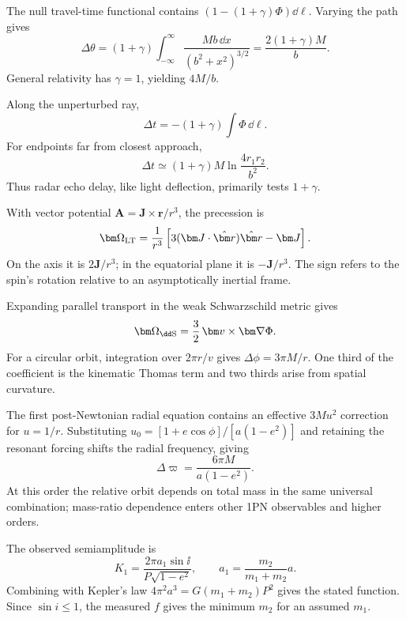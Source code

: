\begin{solution}
The null travel-time functional contains
\((1-(1+\gamma)\Phi)\dd\ell\).  Varying the path gives
\[
\Delta\theta=(1+\gamma)\int_{-\infty}^{\infty}
\frac{Mb\,\dd x}{(b^2+x^2)^{3/2}}
=\frac{2(1+\gamma)M}{b}.
\]
General relativity has \(\gamma=1\), yielding \(4M/b\).
\end{solution}

\begin{solution}
Along the unperturbed ray,
\[
\Delta t=-(1+\gamma)\int\Phi\,\dd\ell.
\]
For endpoints far from closest approach,
\[
\Delta t\simeq(1+\gamma)M
\ln\frac{4r_1r_2}{b^2}.
\]
Thus radar echo delay, like light deflection, primarily tests
\(1+\gamma\).
\end{solution}

\begin{solution}
With vector potential
\(\bm A=\bm J\times\bm r/r^3\), the precession is
\[
\bm\Omega_{\rm LT}
=\frac{1}{r^3}\left[3(\bm J\cdot\hat{\bm r})\hat{\bm r}-\bm J\right].
\]
On the axis it is \(2\bm J/r^3\); in the equatorial plane it is
\(-\bm J/r^3\).  The sign refers to the spin's rotation relative to an
asymptotically inertial frame.
\end{solution}

\begin{solution}
Expanding parallel transport in the weak Schwarzschild metric gives
\[
\bm\Omega_{\rm \dd S}=\frac32\,\bm v\times\bm\nabla\Phi.
\]
For a circular orbit, integration over \(2\pi r/v\) gives
\(\Delta\phi=3\pi M/r\).  One third of the coefficient is the kinematic
Thomas term and two thirds arise from spatial curvature.
\end{solution}

\begin{solution}
The first post-Newtonian radial equation contains an effective
\(3Mu^2\) correction for \(u=1/r\).  Substituting
\(u_0=[1+e\cos\phi]/[a(1-e^2)]\) and retaining the resonant forcing shifts
the radial frequency, giving
\[
\Delta\varpi=\frac{6\pi M}{a(1-e^2)}.
\]
At this order the relative orbit depends on total mass in the same universal
combination; mass-ratio dependence enters other 1PN observables and higher
orders.
\end{solution}

\begin{solution}
The observed semiamplitude is
\[
K_1=\frac{2\pi a_1\sin \ii}{P\sqrt{1-e^2}},
\qquad
a_1=\frac{m_2}{m_1+m_2}a.
\]
Combining with Kepler's law
\(4\pi^2a^3=G(m_1+m_2)P^2\) gives the stated function.  Since
\(\sin i\leq1\), the measured \(f\) gives the minimum \(m_2\) for an assumed
\(m_1\).
\end{solution}

